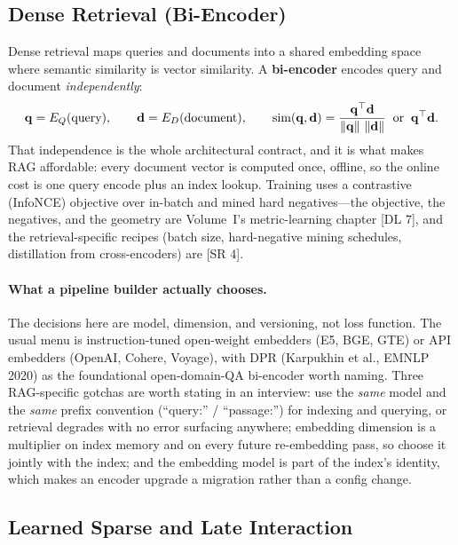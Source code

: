 \subsection{Dense Retrieval (Bi-Encoder)}
\label{sec:dense-retrieval}

Dense retrieval maps queries and documents into a shared embedding space where
semantic similarity is vector similarity.  A \textbf{bi-encoder} encodes query
and document \emph{independently}:
\[
    \mathbf{q} = E_Q(\text{query}), \qquad \mathbf{d} = E_D(\text{document}),
    \qquad
    \text{sim}(\mathbf{q}, \mathbf{d}) = \frac{\mathbf{q}^\top \mathbf{d}}{\left\lVert\mathbf{q}\right\rVert\,\left\lVert\mathbf{d}\right\rVert}
    \;\;\text{or}\;\; \mathbf{q}^\top \mathbf{d}.
\]
That independence is the whole architectural contract, and it is what makes
RAG affordable: every document vector is computed once, offline, so the online
cost is one query encode plus an index lookup.  Training uses a contrastive
(InfoNCE) objective over in-batch and mined hard negatives---the objective,
the negatives, and the geometry are Volume~I's metric-learning chapter
[DL 7], and the retrieval-specific recipes (batch size, hard-negative mining
schedules, distillation from cross-encoders) are [SR 4].

\paragraph{What a pipeline builder actually chooses.}
The decisions here are model, dimension, and versioning, not loss function.
The usual menu is instruction-tuned open-weight embedders (E5, BGE, GTE) or
API embedders (OpenAI, Cohere, Voyage), with DPR (Karpukhin et al., EMNLP
2020) as the foundational open-domain-QA bi-encoder worth naming.  Three
RAG-specific gotchas are worth stating in an interview: use the \emph{same}
model and the \emph{same} prefix convention (``query:'' / ``passage:'') for
indexing and querying, or retrieval degrades with no error surfacing anywhere;
embedding dimension is a multiplier on index memory and on every future
re-embedding pass, so choose it jointly with the index; and the embedding
model is part of the index's identity, which makes an encoder upgrade a
migration rather than a config change.

\subsection{Learned Sparse and Late Interaction}

